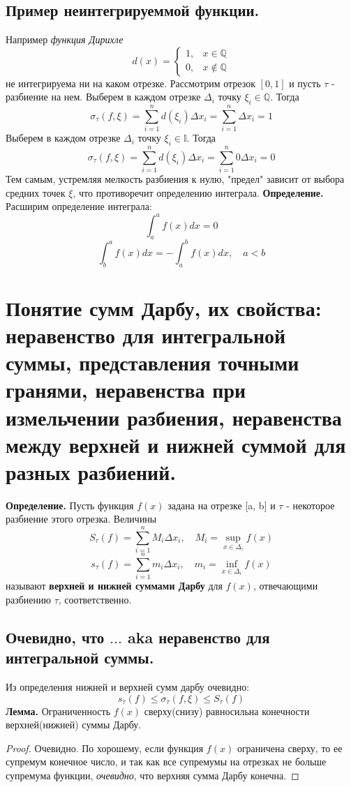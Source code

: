 \documentclass{article}
\newcommand*{\lemma}[1]{\textbf{Лемма.} #1. \newline}
\newcommand*{\definition}[1]{\textbf{Определение.} #1 \newline}
\begin{document}
\subsection{Пример неинтегрируеммой функции.}
Например \textit{функция Дирихле}
$$
    d(x) = 
    \begin{cases}
        1, & x \in \mathbb{Q} \\
        0, & x \notin \mathbb{Q}
    \end{cases}
$$
не интегрируема ни на каком отрезке. Рассмотрим отрезок $[0, 1]$ и пусть $\tau$ - разбиение на нем.
\newline 
Выберем в каждом отрезке $\Delta_i$ точку $\xi_i \in \mathbb{Q}$. Тогда
$$
    \sigma_\tau(f, \xi) = \sum_{i = 1}^{n} d(\xi_i)\Delta x_i = \sum_{i = 1}^{n} \Delta x_i = 1
$$
Выберем в каждом отрезке $\Delta_i$ точку $\xi_i \in \mathbb{I}$. Тогда
$$
    \sigma_\tau(f, \xi) = \sum_{i = 1}^{n} d(\xi_i)\Delta x_i = \sum_{i = 1}^{n} 0\Delta x_i = 0
$$
Тем самым, устремляя мелкость разбиения к нулю, "предел" зависит от выбора средних точек $\xi$, что противоречит определению интеграла.
\newline 
\newline
\definition{Расширим определение интеграла:}
$$
    \int_{a}^{a} f(x)dx = 0
$$
$$
    \int_{b}^{a} f(x)dx = - \int_{a}^{b} f(x)dx, \quad a < b
$$
\section{Понятие сумм Дарбу, их свойства: неравенство для интегральной суммы, представления точными гранями, неравенства при измельчении разбиения, неравенства между верхней и нижней суммой для разных разбиений.}
\definition{Пусть функция $f(x)$ задана на отрезке [a, b] и $\tau$ - некоторое разбиение этого отрезка. Величины}
$$
    S_\tau(f) = \sum_{i = 1}^{n} M_i \Delta x_i, \quad M_i = \displaystyle \sup_{x \in \Delta_i}f(x)
$$
$$
    s_\tau(f) = \sum_{i = 1}^{n} m_i \Delta x_i, \quad m_i = \displaystyle \inf_{x \in \Delta_i}f(x)
$$
называют \textbf{верхней и нижней суммами Дарбу} для $f(x)$, отвечающими разбиению $\tau$, соответственно.
\newline\newline
\subsection{Очевидно, что $\dots$ aka неравенство для интегральной суммы.}  
Из определения нижней и верхней сумм дарбу очевидно: 
$$
    s_\tau(f) \leq \sigma_\tau(f, \xi) \leq S_\tau(f)
$$
\lemma{Ограниченность $f(x)$ сверху(снизу) равносильна конечности верхней(нижней) суммы Дарбу}
\begin{proof}
    Очевидно. 
    \newline 
    По хорошему, если функция $f(x)$ ограничена сверху, то ее супремум конечное число, и так как все супремумы на отрезках не больше супремума функции, \textit{очевидно}, что верхняя сумма Дарбу конечна.
\end{proof}
\end{document}
